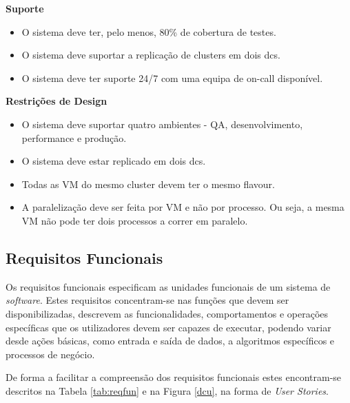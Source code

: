 \textbf{Suporte}
\begin{itemize}
  \item O sistema deve ter, pelo menos, 80\% de cobertura de testes.
  \item O sistema deve suportar a replicação de \glspl{cluster} em dois \glspl{dc}.
  \item O sistema deve ter suporte 24/7 com uma equipa de \gls{on-call} disponível.
\end{itemize}

\textbf{Restrições de Design}
\begin{itemize}
  \item O sistema deve suportar quatro ambientes - \ac{QA}, desenvolvimento, 
    performance e produção.
  \item O sistema deve estar replicado em dois \glspl{dc}.
  \item Todas as \ac{VM} do mesmo \gls{cluster} devem ter o mesmo \gls{flavour}.
  \item A paralelização deve ser feita por \ac{VM} e não por processo. Ou seja, a mesma \ac{VM} 
    não pode ter dois processos a correr em paralelo.
\end{itemize}

\subsection{Requisitos Funcionais}
\label{sec:3-rf}

Os requisitos funcionais especificam as unidades funcionais de um sistema de \textit{software}.
Estes requisitos concentram-se nas funções que devem ser disponibilizadas, descrevem as
funcionalidades, comportamentos e operações específicas que os utilizadores devem ser capazes de 
executar, podendo variar desde ações básicas, como entrada e saída de dados, a algoritmos 
específicos e processos de negócio.

De forma a facilitar a compreensão dos requisitos funcionais estes encontram-se descritos na 
Tabela \ref{tab:reqfun} e na Figura \ref{dcu}, na forma de \textit{User Stories}.

